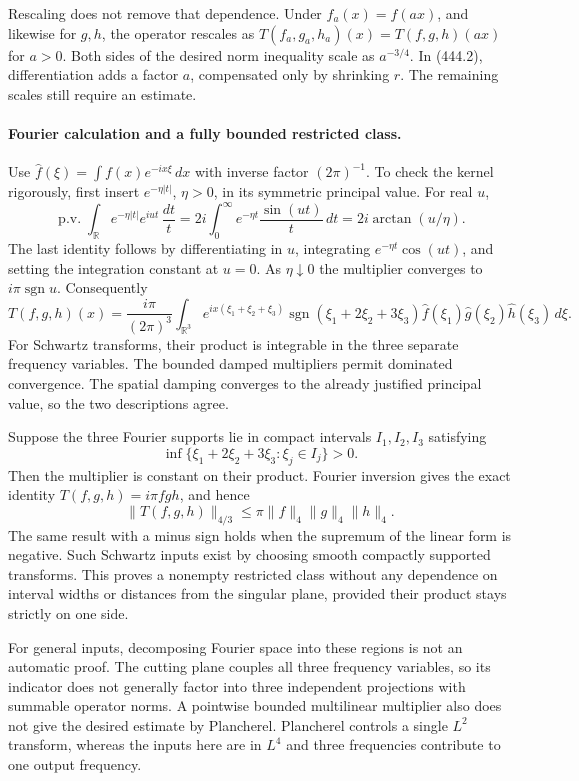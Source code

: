 \documentclass[11pt]{article}
\begin{document}
Rescaling does not remove that dependence. Under $f_a(x)=f(ax)$, and likewise for $g,h$, the operator rescales as $T(f_a,g_a,h_a)(x)=T(f,g,h)(ax)$ for $a>0$. Both sides of the desired norm inequality scale as $a^{-3/4}$. In (444.2), differentiation adds a factor $a$, compensated only by shrinking $r$. The remaining scales still require an estimate.

\paragraph{Fourier calculation and a fully bounded restricted class.}
Use $\widehat f(\xi)=\int f(x)e^{-ix\xi}\,dx$ with inverse factor $(2\pi)^{-1}$. To check the kernel rigorously, first insert $e^{-\eta|t|}$, $\eta>0$, in its symmetric principal value. For real $u$,
\[
 \operatorname{p.v.}\int_{\mathbb R}e^{-\eta|t|}e^{iut}\,\frac{dt}{t}
 =2i\int_0^\infty e^{-\eta t}\frac{\sin(ut)}t\,dt
 =2i\arctan(u/\eta).
 \tag{444.3}
\]
The last identity follows by differentiating in $u$, integrating $e^{-\eta t}\cos(ut)$, and setting the integration constant at $u=0$. As $\eta\downarrow0$ the multiplier converges to $i\pi\operatorname{sgn}u$. Consequently
\[
 T(f,g,h)(x)=\frac{i\pi}{(2\pi)^3}
 \int_{\mathbb R^3}e^{ix(\xi_1+\xi_2+\xi_3)}
 \operatorname{sgn}(\xi_1+2\xi_2+3\xi_3)
 \widehat f(\xi_1)\widehat g(\xi_2)\widehat h(\xi_3)\,d\xi.
 \tag{444.4}
\]
For Schwartz transforms, their product is integrable in the three separate frequency variables. The bounded damped multipliers permit dominated convergence. The spatial damping converges to the already justified principal value, so the two descriptions agree.

Suppose the three Fourier supports lie in compact intervals $I_1,I_2,I_3$ satisfying
\[
 \inf\{\xi_1+2\xi_2+3\xi_3:\xi_j\in I_j\}>0.
 \tag{444.5}
\]
Then the multiplier is constant on their product. Fourier inversion gives the exact identity $T(f,g,h)=i\pi fgh$, and hence
\[
 \|T(f,g,h)\|_{4/3}\le\pi\|f\|_4\|g\|_4\|h\|_4.
 \tag{444.6}
\]
The same result with a minus sign holds when the supremum of the linear form is negative. Such Schwartz inputs exist by choosing smooth compactly supported transforms. This proves a nonempty restricted class without any dependence on interval widths or distances from the singular plane, provided their product stays strictly on one side.

For general inputs, decomposing Fourier space into these regions is not an automatic proof. The cutting plane couples all three frequency variables, so its indicator does not generally factor into three independent projections with summable operator norms. A pointwise bounded multilinear multiplier also does not give the desired estimate by Plancherel. Plancherel controls a single $L^2$ transform, whereas the inputs here are in $L^4$ and three frequencies contribute to one output frequency.
\end{document}
